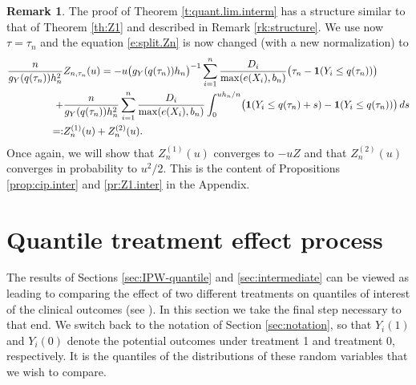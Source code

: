 \documentclass[12pt]{amsart}
\newcommand{\1}{\mathbbm{1}}
\newcommand{\0}{\mathbf{0}}
\newcommand{\one}{\mathbf{1}}
\theoremstyle{plain}
\theoremstyle{definition}
\newtheorem{remark}[theorem]{Remark}
\begin{document}
  \begin{remark} \label{rk:interm.structure}
The proof of Theorem \ref{t:quant.lim.interm} has a structure similar to that of Theorem \ref{th:Z1} and described in Remark \ref{rk:structure}. We use now $\tau=\tau_n$  and the equation \eqref{e:split.Zn} is now changed (with a new normalization) to 
%
\begin{align} \label{e:split.Zn.mod}
\frac{n}{g_Y(q(\tau_n))h_n^2}&Z_{n,\tau_n}(u) = -u\bigl(g_Y(q(\tau_n))h_n\bigr)^{-1} \sum_{i=1}^n  \frac{D_i}{\max(e(X_i),b_n)} 
  \bigl( \tau_n-\one(Y_i\leq q(\tau_n))\bigr) \\
\notag +& \frac{n}{g_Y(q(\tau_n))h_n^2}\sum_{i=1}^n \frac{D_i}{\max(e(X_i),b_n)}\int_0^{uh_n/n}
          \bigl( \one(Y_i\leq q(\tau_n)+s)-\one(Y_i\leq q(\tau_n))\bigr)\,
          ds \\
\notag =:& Z^{(1)}_{n}(u)+ Z^{(2)}_{n}(u). 
\end{align}
%
Once again, we will show that $Z^{(1)}_{n}(u)$ converges to $-uZ$  and that $Z^{(2)}_{n}(u)$ converges in probability to $u^2/2$.  This is the content of Propositions  \ref{prop:cip.inter} and
\ref{pr:Z1.inter} in the Appendix.
\end{remark}






  



\section{Quantile treatment effect process}  \label{sec:qte}

The results of Sections \ref{sec:IPW-quantile} 
and \ref{sec:intermediate} can be 
viewed as leading to comparing the effect of two different treatments on quantiles of interest of the clinical outcomes  (see \cite{firpo2007}).
In this section we take the final step necessary to that end.   We switch back to the notation of Section \ref{sec:notation}, so that   $Y_i(1)$ and $Y_i(0)$ denote the  potential outcomes under treatment 1 and treatment 0, respectively. It is the quantiles of the distributions of these random variables that we wish to compare. 
\end{document}
